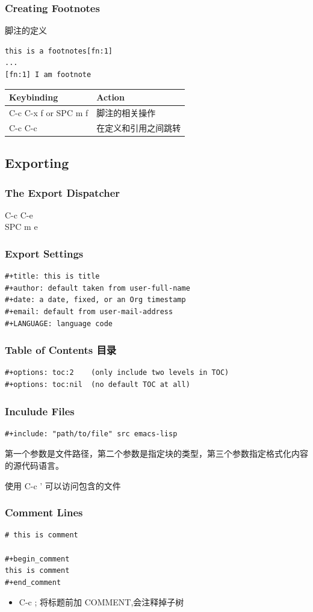 \documentclass[11pt]{article}
\begin{document}
\subsubsection{Creating Footnotes}
\label{sec:orga18c706}
脚注的定义
\begin{verbatim}
this is a footnotes[fn:1]
...
[fn:1] I am footnote
\end{verbatim}


\begin{center}
\begin{tabular}{ll}
Keybinding & Action\\[0pt]
\hline
C-c C-x f or SPC m f & 脚注的相关操作\\[0pt]
C-c C-c & 在定义和引用之间跳转\\[0pt]
\end{tabular}
\end{center}

\subsection{Exporting}
\label{sec:orgcbb1778}

\subsubsection{The Export Dispatcher}
\label{sec:org2a1127c}
C-c C-e \\[0pt]
SPC m e
\subsubsection{Export Settings}
\label{sec:org97f75b3}
\begin{verbatim}
#+title: this is title
#+author: default taken from user-full-name
#+date: a date, fixed, or an Org timestamp
#+email: default from user-mail-address
#+LANGUAGE: language code
\end{verbatim}

\subsubsection{Table of Contents 目录}
\label{sec:org72e4022}
\begin{verbatim}
#+options: toc:2    (only include two levels in TOC)
#+options: toc:nil  (no default TOC at all)
\end{verbatim}
\subsubsection{Inculude Files}
\label{sec:org1a46a46}
\begin{verbatim}
#+include: "path/to/file" src emacs-lisp
\end{verbatim}
第一个参数是文件路径，第二个参数是指定块的类型，第三个参数指定格式化内容的源代码语言。

使用 C-c ' 可以访问包含的文件

\subsubsection{Comment Lines}
\label{sec:orgb66fe88}
\begin{verbatim}
# this is comment

#+begin_comment
this is comment
#+end_comment
\end{verbatim}

\begin{itemize}
\item C-c ;
将标题前加 COMMENT,会注释掉子树
\end{itemize}
\end{document}
